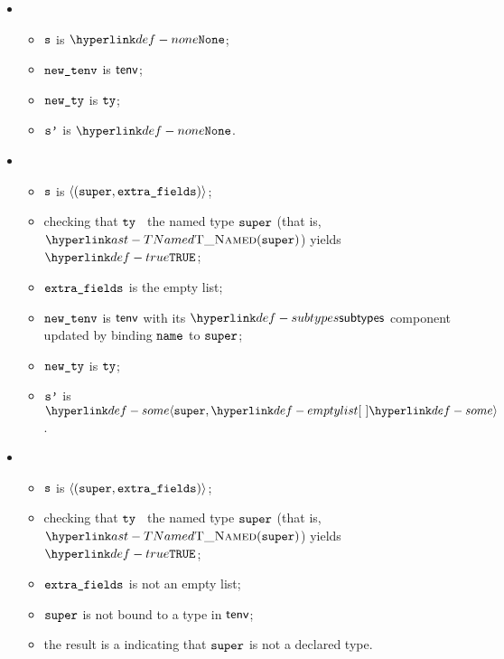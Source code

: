 \ProseParagraph
\OneApplies
\begin{itemize}
  \item {}
  \begin{itemize}
    \item $\texttt{s}$ is $\None$;
    \item $\texttt{new\_tenv}$ is $\textsf{tenv}$;
    \item $\texttt{new\_ty}$ is $\texttt{ty}$;
    \item $\texttt{s'}$ is $\None$.
  \end{itemize}

  \item {}
  \begin{itemize}
    \item $\texttt{s}$ is $\langle(\texttt{super}, \texttt{extra\_fields})\rangle$;
    \item checking that $\texttt{ty}$ \subtypesatisfies\ the named type $\texttt{super}$ (that is, \\ $\TNamed(\vsuper)$) yields
          $\True$\ProseOrTypeError;
    \item $\texttt{extra\_fields}$ is the empty list;
    \item $\texttt{new\_tenv}$ is $\textsf{tenv}$ with its $\subtypes$ component updated by binding $\texttt{name}$ to $\texttt{super}$;
    \item $\texttt{new\_ty}$ is $\texttt{ty}$;
    \item $\texttt{s'}$ is $\some{\vsuper, \emptylist}$.
  \end{itemize}

  \item {}
  \begin{itemize}
    \item $\texttt{s}$ is $\langle(\texttt{super}, \texttt{extra\_fields})\rangle$;
    \item checking that $\texttt{ty}$ \subtypesatisfies\ the named type $\texttt{super}$ (that is, \\ $\TNamed(\vsuper)$) yields
          $\True$\ProseOrTypeError;
    \item $\texttt{extra\_fields}$ is not an empty list;
    \item $\texttt{super}$ is not bound to a type in $\textsf{tenv}$;
    \item the result is a \typingerrorterm{} indicating that $\texttt{super}$ is not a declared type.
  \end{itemize}


\end{itemize}
